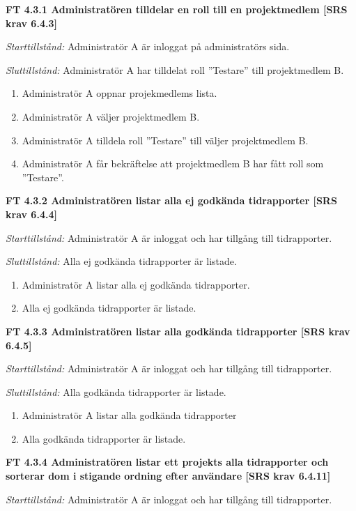 \documentclass[a4paper]{article}
\begin{document}
\textbf{FT 4.3.1 Administratören tilldelar en roll till en projektmedlem [SRS krav 6.4.3]}

\emph{Starttillstånd:} Administratör A är inloggat på administratörs sida.

\emph{Sluttillstånd:} Administratör A har tilldelat roll ”Testare” till projektmedlem B.

\begin{enumerate}
\item Administratör A oppnar projekmedlems lista.
\item Administratör A väljer projektmedlem B.
\item Administratör A tilldela roll  ”Testare” till väljer projektmedlem B.
\item Administratör A får bekräftelse att projektmedlem B har fått roll som ”Testare”.
\end{enumerate}

\textbf{FT 4.3.2 Administratören listar alla ej godkända tidrapporter [SRS krav 6.4.4]}

\emph{Starttillstånd:} Administratör A är inloggat och har tillgång till tidrapporter.

\emph{Sluttillstånd:} Alla ej godkända tidrapporter är listade.

\begin{enumerate}
\item Administratör A listar alla ej godkända tidrapporter.
\item Alla ej godkända tidrapporter är listade.
\end{enumerate}

\textbf{FT 4.3.3 Administratören listar alla godkända tidrapporter [SRS krav 6.4.5]}

\emph{Starttillstånd:}  Administratör A är inloggat och har tillgång till tidrapporter.

\emph{Sluttillstånd:} Alla godkända tidrapporter är listade.

\begin{enumerate}
\item Administratör A listar alla godkända tidrapporter
\item Alla godkända tidrapporter är listade.
\end{enumerate}

\textbf{FT 4.3.4 Administratören listar ett projekts alla tidrapporter och sorterar dom i stigande ordning efter användare [SRS krav 6.4.11]}

\emph{Starttillstånd:} Administratör A är inloggat och har tillgång till tidrapporter.
\end{document}
